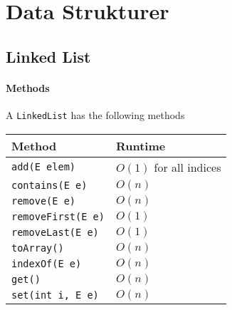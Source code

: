 \documentclass{article}
\begin{document}
    \section{Data Strukturer}
    \subsection{Linked List}
    \paragraph{Methods}
    A \texttt{LinkedList} has the following methods
    \begin{table}[H]
        \begin{center}
            \begin{tabular}[c]{|l|l|}
                \hline
                 Method&Runtime  \\
                \hline
                 \texttt{add(E elem)}& \( O\left( 1 \right) \) for all indices\\
                 \texttt{contains(E e)}& \( O(n) \) \\
                   \texttt{remove(E e)}& \( O(n) \) \\
                   \texttt{removeFirst(E e)}& \( O(1) \) \\
                   \texttt{removeLast(E e)}& \( O(1) \) \\
                   \texttt{toArray()}& \( O(n) \) \\
                   \texttt{indexOf(E e)}& \( O(n) \) \\
                 \texttt{get()}& \( O(n) \) \\
                 \texttt{set(int i, E e)} & \( O(n) \) \\
                \hline
            \end{tabular}
        \end{center}
    \end{table}

    
\end{document}
